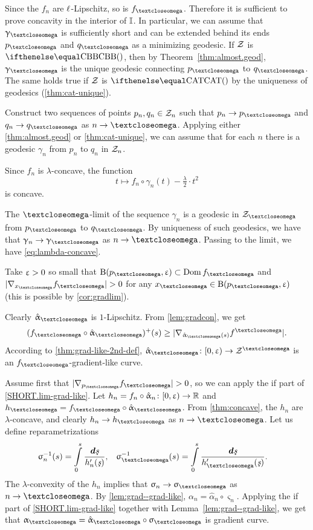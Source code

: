 Since the $f_n$ are ${\ell}$-Lipschitz, so is $f_\o$.
Therefore it is sufficient to prove concavity in the interior of $\mathbb{I}$.
In particular, we can assume that $\gamma_\o$ is sufficiently short and can be extended behind its ends $p_\o$ and $q_\o$ as a minimizing geodesic.
If $\mathcal{Z}$ is $\Alex{}$, then by Theorem~\ref{thm:almost.geod}, $\gamma_\o$ is the unique geodesic connecting $p_\o$ to $q_\o$.
The same holds true if $\mathcal{Z}$ is $\CAT{}$ by the uniqueness of geodesics (\ref{thm:cat-unique}).

Construct two sequences of points $p_n,q_n\in\spc{Z}_n$ such that $p_n\to p_\o$ and $q_n\to q_\o$ as $n\to \o$.
Applying either \ref{thm:almost.geod} or \ref{thm:cat-unique},
we can assume that for each $n$ there is a geodesic $\gamma_n$ from $p_n$ to $q_n$ in $\mathcal{Z}_n$.

Since $f_n$ is $\lambda$-concave, the function 
\[t\mapsto f_n\circ\gamma_n(t)-\tfrac\lambda 2\cdot t^2\]
is concave.

The $\o$-limit of the sequence $\gamma_n$ is a geodesic in $\spc{Z}_\o$ from $p_\o$ to $q_\o$.
By uniqueness of such geodesics, we have that $\gamma_n\to \gamma_\o$ as $n\to \o$.
Passing to the limit, we have \ref{eq:lambda-concave}.

Take $\upvarepsilon>0$ so small that $\oBall(p_\o,\eps)\subset\Dom f_\o$ and $|\nabla_{x_\o}f_\o|\z>0$ for any $x_\o\in\oBall(p_\o,\eps)$ (this is possible by \ref{cor:gradlim}).

Clearly $\hat\alpha_\o$ is $1$-Lipschitz.
From \ref{lem:gradcon}, we get 
\[(f_\o\circ\hat\alpha_\o)^+(s)
\ge
|\nabla_{\hat\alpha_\o(s)}f^\o|.\]
According to \ref{thm:grad-like-2nd-def}, $\hat\alpha_\o\:[0,\eps)\to \spc{Z}^\o$  is an $f_\o$-gradient-like curve.

Assume first that $|\nabla_{p_\o}f_\o|>0$, 
so we can apply the if part of \ref{SHORT.lim-grad-like}.
Let $h_n=f_n\circ\hat\alpha_n\:[0,\eps)\to \RR$ 
and $h_\o=f_\o\circ\hat\alpha_\o$.
From \ref{thm:concave}, the $h_n$ are $\lambda$-concave, and clearly $h_n\to h_\o$ as $n\to\o$.
Let us define reparametrizations
\begin{align*}
{\varsigma_n^{-1}(s)}
&=
\int\limits_0^{s}\frac{\dd\under s}{h_n'(\under s)},
&
{\varsigma_\o^{-1}(s)}
&=
\int\limits_0^{s}\frac{\dd\under s}{h_\o'(\under s)}.
\end{align*}
The $\lambda$-convexity of the $h_n$ implies that $\sigma_n\to\sigma_\o$ as $n\to\o$.
By \ref{lem:grad--grad-like}, 
$\alpha_n=\hat\alpha_n\circ\varsigma_n$.
Applying the if part of \ref{SHORT.lim-grad-like} together with Lemma~\ref{lem:grad--grad-like},
we get that $\alpha_\o=\hat\alpha_\o\circ\varsigma_\o$ is gradient curve.

